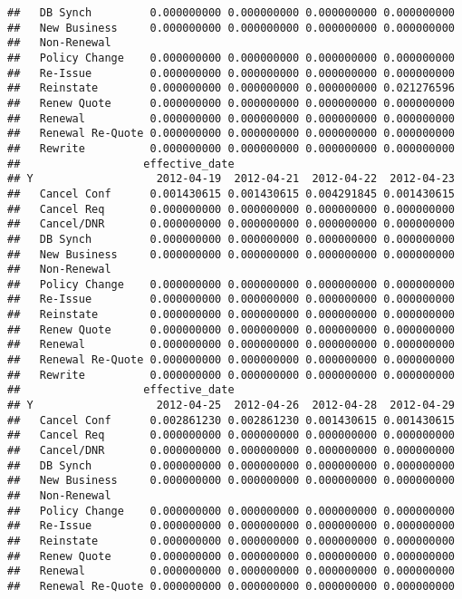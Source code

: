 \documentclass[]{article}
\begin{document}
\begin{verbatim}
##   DB Synch         0.000000000 0.000000000 0.000000000 0.000000000
##   New Business     0.000000000 0.000000000 0.000000000 0.000000000
##   Non-Renewal                                                     
##   Policy Change    0.000000000 0.000000000 0.000000000 0.000000000
##   Re-Issue         0.000000000 0.000000000 0.000000000 0.000000000
##   Reinstate        0.000000000 0.000000000 0.000000000 0.021276596
##   Renew Quote      0.000000000 0.000000000 0.000000000 0.000000000
##   Renewal          0.000000000 0.000000000 0.000000000 0.000000000
##   Renewal Re-Quote 0.000000000 0.000000000 0.000000000 0.000000000
##   Rewrite          0.000000000 0.000000000 0.000000000 0.000000000
##                   effective_date
## Y                   2012-04-19  2012-04-21  2012-04-22  2012-04-23
##   Cancel Conf      0.001430615 0.001430615 0.004291845 0.001430615
##   Cancel Req       0.000000000 0.000000000 0.000000000 0.000000000
##   Cancel/DNR       0.000000000 0.000000000 0.000000000 0.000000000
##   DB Synch         0.000000000 0.000000000 0.000000000 0.000000000
##   New Business     0.000000000 0.000000000 0.000000000 0.000000000
##   Non-Renewal                                                     
##   Policy Change    0.000000000 0.000000000 0.000000000 0.000000000
##   Re-Issue         0.000000000 0.000000000 0.000000000 0.000000000
##   Reinstate        0.000000000 0.000000000 0.000000000 0.000000000
##   Renew Quote      0.000000000 0.000000000 0.000000000 0.000000000
##   Renewal          0.000000000 0.000000000 0.000000000 0.000000000
##   Renewal Re-Quote 0.000000000 0.000000000 0.000000000 0.000000000
##   Rewrite          0.000000000 0.000000000 0.000000000 0.000000000
##                   effective_date
## Y                   2012-04-25  2012-04-26  2012-04-28  2012-04-29
##   Cancel Conf      0.002861230 0.002861230 0.001430615 0.001430615
##   Cancel Req       0.000000000 0.000000000 0.000000000 0.000000000
##   Cancel/DNR       0.000000000 0.000000000 0.000000000 0.000000000
##   DB Synch         0.000000000 0.000000000 0.000000000 0.000000000
##   New Business     0.000000000 0.000000000 0.000000000 0.000000000
##   Non-Renewal                                                     
##   Policy Change    0.000000000 0.000000000 0.000000000 0.000000000
##   Re-Issue         0.000000000 0.000000000 0.000000000 0.000000000
##   Reinstate        0.000000000 0.000000000 0.000000000 0.000000000
##   Renew Quote      0.000000000 0.000000000 0.000000000 0.000000000
##   Renewal          0.000000000 0.000000000 0.000000000 0.000000000
##   Renewal Re-Quote 0.000000000 0.000000000 0.000000000 0.000000000

\end{verbatim}
\end{document}
